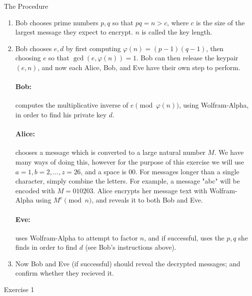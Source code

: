 \documentclass{article}
\begin{document}
    \huge The Procedure
    \normalsize
    \bigskip
    \begin{enumerate}

        $TO DO: CHANGE THE ID'S OF EACH TEXTBOOK$
        
\item Bob chooses prime numbers $p,q$ so that $pq=n>c$, where $c$ is the size of the largest message they expect to encrypt. $n$ is called the key length.

\item Bob chooses $e,d$ by first computing $\varphi(n)=(p-1)(q-1)$, then choosing $e$ so that $\gcd(e,\varphi(n))=1$. Bob can then release the keypair $(e,n)$, and now each Alice, Bob, and Eve have their own step to perform.
    
    \paragraph{Bob:} computes the multiplicative inverse of $e\pmod{\varphi(n)}$, using Wolfram-Alpha, in order to find his private key $d$.

    \paragraph{Alice:} chooses a message which is converted to a large natural number $M$. We have many ways of doing this, however for the purpose of this exercise we will use $a=1, b=2,\dots, z=26$, and a space is $00$. For messages longer than a single character, simply combine the letters. For example, a message "abc" will be encoded with $M=010203$. Alice encrypts her message text with Wolfram-Alpha using $M^e\pmod{n}$, and reveals it to both Bob and Eve.

    \paragraph{Eve:} uses Wolfram-Alpha to attempt to factor $n$, and if successful, uses the $p,q$ she finds in order to find $d$ (see Bob's instructions above).

\item Now Bob and Eve (if successful) should reveal the decrypted messages; and confirm whether they recieved it.
\end{enumerate}

\newpage

    \huge Exercise 1
    \normalsize
\end{document}
